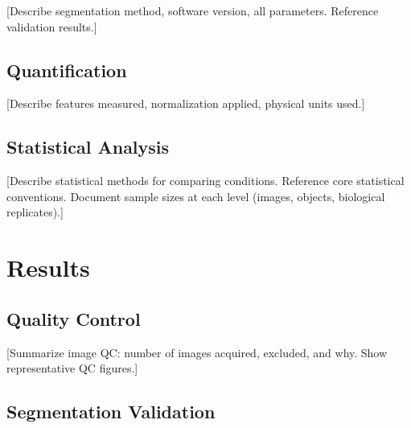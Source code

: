 \documentclass[11pt,a4paper]{article}
\begin{document}
[Describe segmentation method, software version, all parameters.
Reference validation results.]


\subsection{Quantification}

[Describe features measured, normalization applied, physical units used.]

\subsection{Statistical Analysis}

[Describe statistical methods for comparing conditions. Reference core
statistical conventions. Document sample sizes at each level (images,
objects, biological replicates).]

\section{Results}

\subsection{Quality Control}

[Summarize image QC: number of images acquired, excluded, and why.
Show representative QC figures.]

\subsection{Segmentation Validation}
\end{document}

